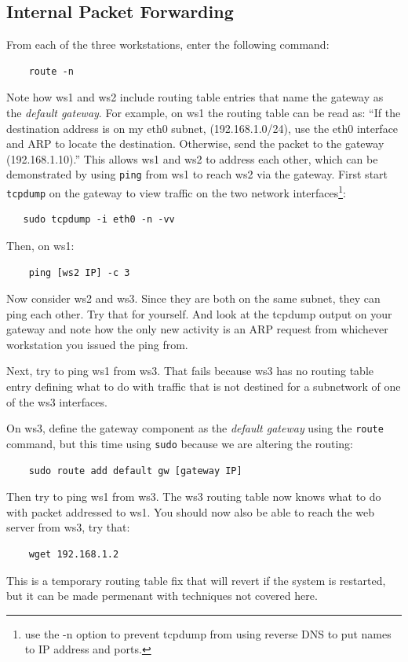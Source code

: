 \subsection{Internal Packet Forwarding}
From each of the three workstations, enter the following command:
\begin{verbatim}
    route -n
\end{verbatim}
\noindent Note how ws1 and ws2 include routing table entries that name the
gateway as the \textit{default gateway}.  For example, on ws1 the routing table can be read as:
``If the destination address is on my eth0 subnet, (192.168.1.0/24), use the eth0 interface
and ARP to locate the destination.  Otherwise, send the packet to the gateway (192.168.1.10).'' 
This allows ws1 and ws2 to address each other, which 
can be demonstrated by using \texttt{ping} from ws1 to reach ws2 via the gateway.  First start
{\tt tcpdump} on the gateway to view traffic on the two network interfaces\footnote{use the -n option to prevent tcpdump from
using reverse DNS to put names to IP address and ports.}:   
\begin{verbatim}
   sudo tcpdump -i eth0 -n -vv
\end{verbatim}

\noindent Then, on ws1:
\begin{verbatim}
    ping [ws2 IP] -c 3
\end{verbatim}

Now consider ws2 and ws3.  Since they are both on the same subnet, they can ping
each other.  Try that for yourself. And look at the tcpdump output on your gateway
and note how the only new activity is an ARP request from whichever workstation you
issued the ping from. 

Next, try to ping ws1 from ws3.  That fails because ws3 has no routing table entry defining what to do with traffic 
that is not destined for a subnetwork of one of the ws3 interfaces.

On ws3, define the gateway component as the \textit{default gateway} using the 
\texttt{route} command, but this time using \texttt{sudo} because we are altering the routing:

\begin{verbatim}
    sudo route add default gw [gateway IP]
\end{verbatim}
\noindent Then try to ping ws1 from ws3.  The ws3 routing table now knows what
to do with packet addressed to ws1.  You should now also be able to reach the web server
from ws3, try that:
\begin{verbatim}
    wget 192.168.1.2
\end{verbatim}  
This is a temporary routing table fix that will revert if the
system is restarted, but it can be made permenant with techniques not covered here.

